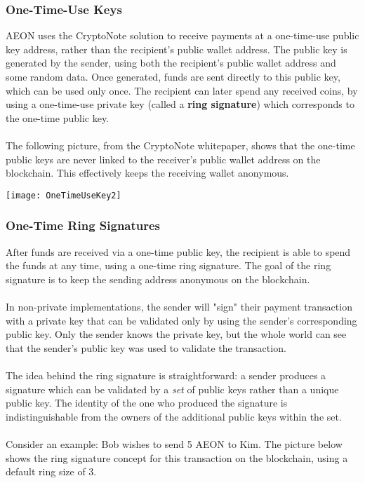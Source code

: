 \subsubsection{One-Time-Use Keys}
AEON uses the CryptoNote solution to receive payments at a one-time-use public key address, rather than the recipient's public wallet address.  The public key is generated by the sender, using both the recipient's public wallet address and some random data.  Once generated, funds are sent directly to this public key, which can be used only once.  The recipient can later spend any received coins, by using a one-time-use private key (called a \textbf{ring signature}) which corresponds to the one-time public key.\\
\\
The following picture, from the CryptoNote whitepaper, shows that the one-time public keys are never linked to the receiver's public wallet address on the blockchain.  This effectively keeps the receiving wallet anonymous.\\

\begin{center}
	\texttt{[image: OneTimeUseKey2]}
\end{center}

\subsubsection{One-Time Ring Signatures}
After funds are received via a one-time public key, the recipient is able to spend the funds at any time, using a one-time ring signature.  The goal of the ring signature is to keep the sending address anonymous on the blockchain.\\
\\
In non-private implementations, the sender will "sign" their payment transaction with a private key that can be validated only by using the sender's corresponding public key.  Only the sender knows the private key, but the whole world can see that the sender's public key was used to validate the transaction.\\
\\
The idea behind the ring signature is straightforward:  a sender produces a signature which can be validated by a \textit{set} of public keys rather than a unique public key.  The identity of the one who produced the signature is indistinguishable from the owners of the additional public keys within the set.\\
\\
Consider an example:  Bob wishes to send 5 AEON to Kim.  The picture below shows the ring signature concept for this transaction on the blockchain, using a default ring size of 3.\\

